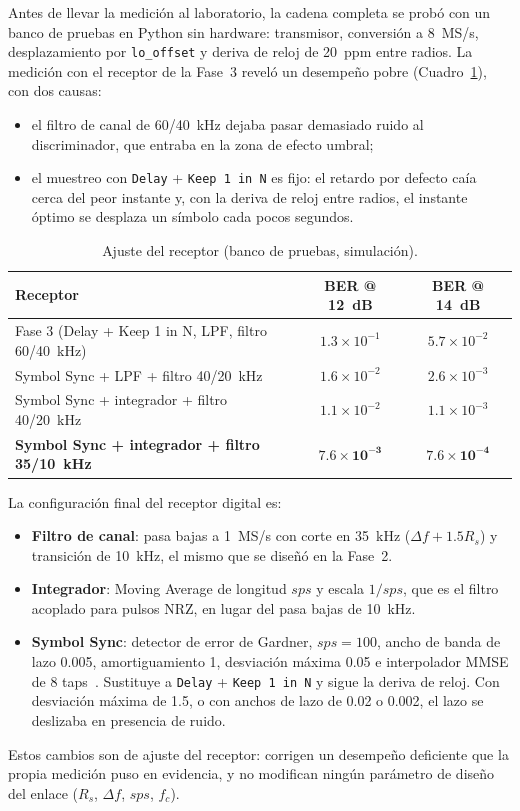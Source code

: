 \documentclass[conference]{IEEEtran}
\begin{document}
Antes de llevar la medición al laboratorio, la cadena completa se probó con un banco de pruebas en Python sin hardware: transmisor, conversión a 8~MS/s, desplazamiento por \texttt{lo\_offset} y deriva de reloj de 20~ppm entre radios. La medición con el receptor de la Fase~3 reveló un desempeño pobre (Cuadro~\ref{tab:ajuste}), con dos causas:
\begin{itemize}
\item el filtro de canal de 60/40~kHz dejaba pasar demasiado ruido al discriminador, que entraba en la zona de efecto umbral;
\item el muestreo con \texttt{Delay} + \texttt{Keep 1 in N} es fijo: el retardo por defecto caía cerca del peor instante y, con la deriva de reloj entre radios, el instante óptimo se desplaza un símbolo cada pocos segundos.
\end{itemize}

\begin{table}[!t]
\centering
\caption{Ajuste del receptor (banco de pruebas, simulación).}
\label{tab:ajuste}
\begin{tabular}{>{\raggedright}p{4.4cm}cc}
\toprule
Receptor & BER @ 12~dB & BER @ 14~dB \\
\midrule
Fase 3 (Delay + Keep 1 in N, LPF, filtro 60/40~kHz) & $1.3\times10^{-1}$ & $5.7\times10^{-2}$ \\
Symbol Sync + LPF + filtro 40/20~kHz & $1.6\times10^{-2}$ & $2.6\times10^{-3}$ \\
Symbol Sync + integrador + filtro 40/20~kHz & $1.1\times10^{-2}$ & $1.1\times10^{-3}$ \\
\textbf{Symbol Sync + integrador + filtro 35/10~kHz} & $\mathbf{7.6\times10^{-3}}$ & $\mathbf{7.6\times10^{-4}}$ \\
\bottomrule
\end{tabular}
\end{table}

La configuración final del receptor digital es:
\begin{itemize}
\item \textbf{Filtro de canal}: pasa bajas a 1~MS/s con corte en 35~kHz ($\Delta f + 1.5 R_s$) y transición de 10~kHz, el mismo que se diseñó en la Fase~2.
\item \textbf{Integrador}: Moving Average de longitud $sps$ y escala $1/sps$, que es el filtro acoplado para pulsos NRZ, en lugar del pasa bajas de 10~kHz.
\item \textbf{Symbol Sync}: detector de error de Gardner, $sps = 100$, ancho de banda de lazo 0.005, amortiguamiento 1, desviación máxima 0.05 e interpolador MMSE de 8 taps~\cite{symsync}. Sustituye a \texttt{Delay} + \texttt{Keep 1 in N} y sigue la deriva de reloj. Con desviación máxima de 1.5, o con anchos de lazo de 0.02 o 0.002, el lazo se deslizaba en presencia de ruido.
\end{itemize}
Estos cambios son de ajuste del receptor: corrigen un desempeño deficiente que la propia medición puso en evidencia, y no modifican ningún parámetro de diseño del enlace ($R_s$, $\Delta f$, $sps$, $f_c$).
\end{document}
